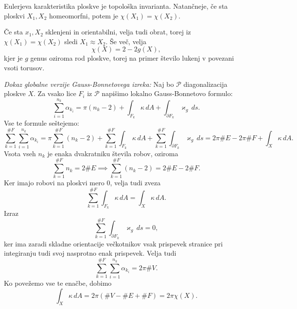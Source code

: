 \begin{izrek}
\label{izr_Eulerjeva_karakteristika_je_topoloska_invarianta}
Eulerjeva karakteristika ploskve je topološka invarianta. Natančneje, če sta ploskvi $X_1, X_2$ homeomorfni, potem 
je $\chi(X_1) = \chi(X_2)$. 
\end{izrek}

Če sta $x_1, X_2$ sklenjeni in orientabilni, velja tudi obrat, torej iz $\chi(X_1) = \chi(X_2)$ sledi $X_1 \approx X_2$. Še več, velja \begin{equation*}
\chi(X) = 2 - 2g(X),
\end{equation*}  
kjer je $g$ genus oziroma rod ploskve, torej na primer število lukenj v povezani vsoti torusov.

\noindent
{\em Dokaz globalne verzije Gauss-Bonnetovega izreka:\/}
Naj bo $\mathcal{P}$ diagonalizacija ploskve $X$. Za vsako lice $F_i$ iz $\mathcal{P}$ napišimo lokalno Gauss-Bonnetovo formulo:
\begin{equation*}
\sum_{i = 1}^{n_k} \alpha_{k_i} = \pi(n_k - 2) + \int_{F_k} \kappa \, dA + \int_{\partial F_k } \varkappa_g \, ds.  
\end{equation*}  
Vse te formule seštejemo: \begin{equation*}
\sum_{k = 1}^{\#F} \sum_{i = 1}^{n_k} \alpha_{k_i} = \pi \sum_{k = 1}^{\#F}  (n_k - 2) + \sum_{k = 1}^{\#F}  \int_{F_k} \kappa \, dA + \sum_{k = 1}^{\#F}  \int_{\partial F_k } \varkappa_g \, ds = 2 \pi \#E - 2\pi \# F + \int_{X} \kappa \, dA. 
\end{equation*}  
Vsota vseh $n_k$ je enaka dvakratniku števila robov, oziroma \begin{equation*}
    \sum_{k = 1}^{\#F} n_k = 2 \# E \implies \sum_{k = 1}^{\#F}  (n_k - 2) = 2 \# E - 2 \# F.
\end{equation*}  
  Ker imajo robovi na ploskvi mero $0$, velja tudi zveza \begin{equation*}
    \sum_{k = 1}^{\#F}  \int_{F_k} \kappa \, dA = \int_{X} \kappa \, dA.  
  \end{equation*}  
Izraz \begin{equation*}
    \sum_{k = 1}^{\#F} \int_{\partial F_k} \varkappa_g \, ds = 0, 
\end{equation*}  
ker ima zaradi skladne orientacije večkotnikov vsak prispevek stranice pri integiranju tudi svoj nasprotno enak prispevek. 
Velja tudi \begin{equation*}
    \sum_{k = 1}^{\#F} \sum_{i = 1}^{n_k} \alpha_{k_i} = 2 \pi \# V.
\end{equation*}  
Ko povežemo vse te enačbe, dobimo \begin{equation*}
\int_{X} \kappa \, dA = 2 \pi (\# V - \# E + \# F ) = 2 \pi \chi(X). 
\end{equation*}  
  
